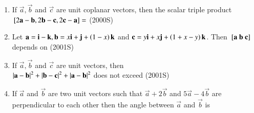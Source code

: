 \documentclass[journal,12pt,twocolumn]{IEEEtran}
\theoremstyle{remark}
\begin{document}
\begin{enumerate}
\begin{enumerate}
\end{enumerate}
\item If $\vec{a},\vec{b}$ and $\vec{c}$ are unit coplanar vectors, then the scalar triple product ${}\left[2\mathbf{a}-\mathbf{b},2\mathbf{b}-\mathbf{c},2\mathbf{c}-\mathbf{a}\right] = $
\hfill (2000S)
\begin{enumerate}
\end{enumerate}
\item Let $\mathbf{a}= \mathbf{i}-\mathbf{k},\mathbf{b}=x\mathbf{i}+\mathbf{j}+\left(1-x\right)\mathbf{k}$ and $\mathbf{c}= y\mathbf{i}+x\mathbf{j}+\left(1+x-y\right)\mathbf{k}$. Then ${}\left[\mathbf{a} \ \mathbf{b} \ \mathbf{c}\right]$ depends on 
\hfill (2001S)
\begin{enumerate}
\end{enumerate}
\item If $\vec{a},\vec{b}$ and $\vec{c}$ are unit vectors, then \\
$\left\vert\mathbf{a}-\mathbf{b}\right\vert^2+\left\vert\mathbf{b}-\mathbf{c}\right\vert^2+\left\vert\mathbf{a}-\mathbf{b}\right\vert^2$ does not exceed 
\hfill (2001S)
\begin{enumerate}
\end{enumerate}
\item If $\vec{a}$ and $\vec{b}$ are two unit vectors such that $\vec{a}+2\vec{b}$ and $5\vec{a}-4\vec{b}$ are perpendicular to each other then the angle between $\vec{a}$ and $\vec{b}$ is 

\end{enumerate}
\end{document}
